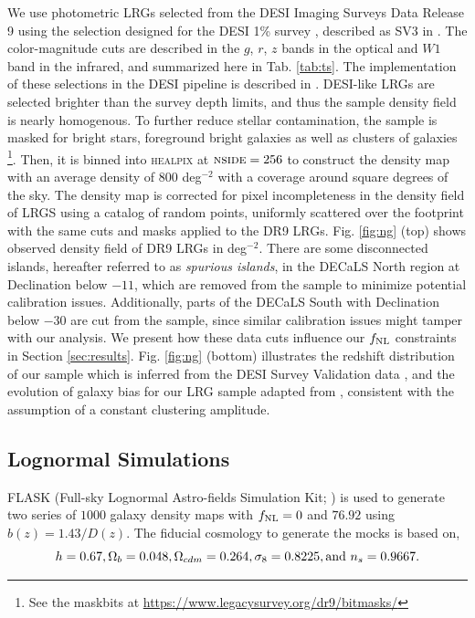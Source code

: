 We use photometric LRGs selected from the DESI Imaging Surveys Data Release 9 \citep[DR9;][]{dey2018overview} using the selection designed for the DESI 1\% survey , described as SV3 in \cite{zhou2021clustering}. The color-magnitude cuts are described in the $g$, $r$, $z$ bands in the optical and $W1$ band in the infrared, and summarized here in Tab. \ref{tab:ts}. The implementation of these selections in the DESI pipeline is described in . DESI-like LRGs are selected brighter than the survey depth limits, and thus the sample density field is nearly homogenous. To further reduce stellar contamination, the sample is masked for bright stars, foreground bright galaxies as well as clusters of galaxies \footnote{See the maskbits at \url{https://www.legacysurvey.org/dr9/bitmasks/}}. Then, it is binned into \textsc{healpix} \citep{gorski2005healpix} at $\textsc{nside}=256$ to construct the density map with an average density of $800$ deg$^{-2}$ with a coverage around  square degrees of the sky. The density map is corrected for pixel incompleteness in the density field of LRGS using a catalog of random points, uniformly scattered over the footprint with the same cuts and masks applied to the DR9 LRGs. Fig. \ref{fig:ng} (top) shows observed density field of DR9 LRGs in deg$^{-2}$. There are some disconnected islands, hereafter referred to as \textit{spurious islands}, in the DECaLS North region at Declination below $-11$, which are removed from the sample to minimize potential calibration issues. Additionally, parts of the DECaLS South with Declination below $-30$ are cut from the sample, since similar calibration issues might tamper with our analysis. We present  how these data cuts influence our $f_{\rm NL}$ constraints in Section \ref{sec:results}. Fig. \ref{fig:ng} (bottom) illustrates the redshift distribution of our sample which is inferred from the DESI Survey Validation data , and the evolution of  galaxy bias for our LRG sample adapted from \cite{zhou2021clustering}, consistent with the assumption of a constant clustering amplitude.

\subsection{Lognormal Simulations}
\textsc{FLASK} (Full-sky Lognormal Astro-fields Simulation Kit; ) is used to generate two series of $1000$ galaxy density maps with $f_{\rm NL}=0$ and $76.92$ using $b(z)=1.43/D(z)$. The fiducial cosmology to generate the mocks is based on,
\begin{equation*}
h = 0.67, \Omega_{b}=0.048, \Omega_{cdm}=0.264, \sigma_{8}=0.8225, {\rm and}~ n_{s}=0.9667.
\end{equation*}



